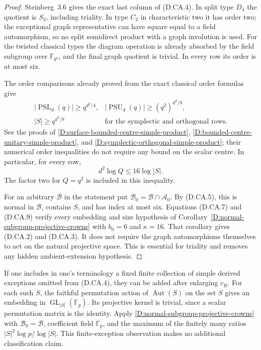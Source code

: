 \begin{proof}
Steinberg~3.6 gives the exact last column of (D.CA.4).
In split type $D_4$ the quotient is $S_3$, including
triality. In type $C_2$ in characteristic two it has
order two; the exceptional graph representative can
have square equal to a field automorphism, so no split
semidirect product with a graph involution is used.
For the twisted classical types the diagram operation
is already absorbed by the field subgroup over
$\mathbb F_{q^2}$, and the final graph quotient is
trivial. In every row its order is at most six.

The order comparisons already proved from the exact
classical order formulas give
\[
 \begin{array}{ll}
 |\operatorname{PSL}_d(q)|\geq q^{d^2/4},
       &|\operatorname{PSU}_d(q)|\geq(q^2)^{d^2/8},\\
 |S|\geq q^{d^2/8}
       &\text{for the symplectic and orthogonal rows}.
 \end{array}                                           \tag{D.CA.8}
\]
See the proofs of
\ref{D:surface-bounded-centre-simple-product},
\ref{D:bounded-centre-unitary-simple-product}, and
\ref{D:symplectic-orthogonal-simple-product}; their
numerical order inequalities do not require any bound
on the scalar centre. In particular, for every row,
\[
                         d^2\log Q\leq16\log|S|.
                                                        \tag{D.CA.9}
\]
The factor two for $Q=q^2$ is included in this inequality.

For an arbitrary $\mathcal B$ in the statement put
$\mathcal B_0=\mathcal B\cap\mathcal A_0$. By (D.CA.5),
this is normal in $\mathcal B$, contains $S$, and has
index at most six. Equations (D.CA.7) and (D.CA.9)
verify every embedding and size hypothesis of
Corollary~\ref{D:normal-subgroup-projective-crowns} with
$b_0=6$ and $\kappa=16$. That corollary gives (D.CA.2)
and (D.CA.3). It does not require the graph automorphisms
themselves to act on the natural projective space.
This is essential for triality and removes any hidden
ambient-extension hypothesis.
\end{proof}

\begin{remark}
If one includes in one's terminology a fixed finite
collection of simple derived exceptions omitted from
(D.CA.4), they can be added after enlarging $c_R$.
For each such $S$, the faithful permutation action of
$\operatorname{Aut}(S)$ on the set $S$ gives an embedding
in $\operatorname{GL}_{|S|}(\mathbb F_p)$. Its projective
kernel is trivial, since a scalar permutation matrix
is the identity. Apply
\ref{D:normal-subgroup-projective-crowns} with
$\mathcal B_0=\mathcal B$, coefficient field
$\mathbb F_p$, and the maximum of the finitely many
ratios $|S|^2\log p/\log|S|$. This finite-exception
observation makes no additional classification claim.
\end{remark}
